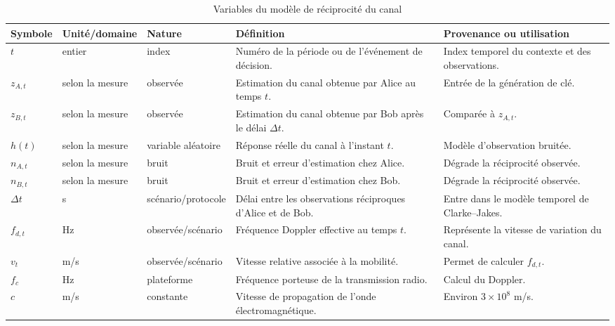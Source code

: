 \documentclass[conference,a4paper]{IEEEtran}
\begin{document}
\begin{table}[H]
\centering
\caption{Variables du modèle de réciprocité du canal}
\label{tab:variables-reciprocite}
\renewcommand{\arraystretch}{1.15}
\scriptsize

\begin{tabularx}{\textwidth}{
@{}l
l
l
Y
Y@{}}
\toprule
\textbf{Symbole} &
\textbf{Unité/domaine} &
\textbf{Nature} &
\textbf{Définition} &
\textbf{Provenance ou utilisation} \\
\midrule

$t$
& entier
& index
& Numéro de la période ou de l'événement de décision.
& Index temporel du contexte et des observations. \\

$z_{A,t}$
& selon la mesure
& observée
& Estimation du canal obtenue par Alice au temps $t$.
& Entrée de la génération de clé. \\

$z_{B,t}$
& selon la mesure
& observée
& Estimation du canal obtenue par Bob après le délai $\Delta t$.
& Comparée à $z_{A,t}$. \\

$h(t)$
& selon la mesure
& variable aléatoire
& Réponse réelle du canal à l'instant $t$.
& Modèle d'observation bruitée. \\

$n_{A,t}$
& selon la mesure
& bruit
& Bruit et erreur d'estimation chez Alice.
& Dégrade la réciprocité observée. \\

$n_{B,t}$
& selon la mesure
& bruit
& Bruit et erreur d'estimation chez Bob.
& Dégrade la réciprocité observée. \\

$\Delta t$
& s
& scénario/protocole
& Délai entre les observations réciproques d'Alice et de Bob.
& Entre dans le modèle temporel de Clarke--Jakes. \\

$f_{d,t}$
& Hz
& observée/scénario
& Fréquence Doppler effective au temps $t$.
& Représente la vitesse de variation du canal. \\

$v_t$
& m/s
& observée/scénario
& Vitesse relative associée à la mobilité.
& Permet de calculer $f_{d,t}$. \\

$f_c$
& Hz
& plateforme
& Fréquence porteuse de la transmission radio.
& Calcul du Doppler. \\

$c$
& m/s
& constante
& Vitesse de propagation de l'onde électromagnétique.
& Environ $3\times10^8$ m/s. \\


\end{tabularx}
\end{table}
\end{document}
